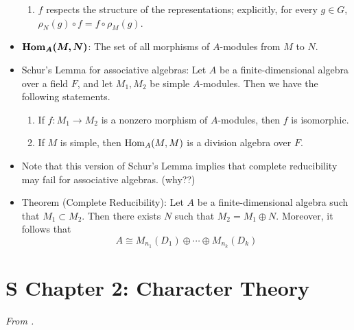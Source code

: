 \documentclass[../notes.tex]{subfiles}
\begin{document}
\begin{itemize}
\begin{enumerate}
        \item $f$ respects the structure of the representations; explicitly, for every $g\in G$, $\rho_N(g)\circ f=f\circ\rho_M(g)$.
    \end{enumerate}
    \item $\bm{\Hom_A(M,N)}$: The set of all morphisms of $A$-modules from $M$ to $N$.
    \item Schur's Lemma for associative algebras: Let $A$ be a finite-dimensional algebra over a field $F$, and let $M_1,M_2$ be simple $A$-modules. Then we have the following statements.
    \begin{enumerate}
        \item If $f:M_1\to M_2$ is a nonzero morphism of $A$-modules, then $f$ is isomorphic.
        \item If $M$ is simple, then $\operatorname{Hom}_A(M,M)$ is a division algebra over $F$.
    \end{enumerate}
    \item Note that this version of Schur's Lemma implies that complete reducibility may fail for associative algebras. (why??)
    \item Theorem (Complete Reducibility): Let $A$ be a finite-dimensional algebra such that $M_1\subset M_2$. Then there exists $N$ such that $M_2=M_1\oplus N$. Moreover, it follows that
    \begin{equation*}
        A \cong M_{n_1}(D_1)\oplus\cdots\oplus M_{n_k}(D_k)
    \end{equation*}
\end{itemize}



\section{S Chapter 2: Character Theory}
\emph{From \textcite{bib:Serre}.}
\end{document}
